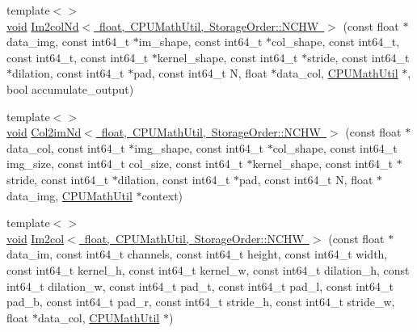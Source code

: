 \begin{DoxyCompactItemize}
\item 
{\footnotesize template$<$$>$ }\\\mbox{\hyperlink{mlasi_8h_a88f941d423cb2a819b70a1358982b1a6}{void}} \mbox{\hyperlink{namespaceonnxruntime_1_1math_a81ac2d7f2ea2b9bc15c568bc0733f7b9}{Im2col\+Nd$<$ float, C\+P\+U\+Math\+Util, Storage\+Order\+::\+N\+C\+H\+W $>$}} (const float $\ast$data\+\_\+img, const int64\+\_\+t $\ast$im\+\_\+shape, const int64\+\_\+t $\ast$col\+\_\+shape, const int64\+\_\+t, const int64\+\_\+t, const int64\+\_\+t $\ast$kernel\+\_\+shape, const int64\+\_\+t $\ast$stride, const int64\+\_\+t $\ast$dilation, const int64\+\_\+t $\ast$pad, const int64\+\_\+t N, float $\ast$data\+\_\+col, \mbox{\hyperlink{classonnxruntime_1_1CPUMathUtil}{C\+P\+U\+Math\+Util}} $\ast$, bool accumulate\+\_\+output)
\item 
{\footnotesize template$<$$>$ }\\\mbox{\hyperlink{mlasi_8h_a88f941d423cb2a819b70a1358982b1a6}{void}} \mbox{\hyperlink{namespaceonnxruntime_1_1math_a8e8d34a7f9a4fcf0b2f8f511f75b20cc}{Col2im\+Nd$<$ float, C\+P\+U\+Math\+Util, Storage\+Order\+::\+N\+C\+H\+W $>$}} (const float $\ast$data\+\_\+col, const int64\+\_\+t $\ast$img\+\_\+shape, const int64\+\_\+t $\ast$col\+\_\+shape, const int64\+\_\+t img\+\_\+size, const int64\+\_\+t col\+\_\+size, const int64\+\_\+t $\ast$kernel\+\_\+shape, const int64\+\_\+t $\ast$stride, const int64\+\_\+t $\ast$dilation, const int64\+\_\+t $\ast$pad, const int64\+\_\+t N, float $\ast$data\+\_\+img, \mbox{\hyperlink{classonnxruntime_1_1CPUMathUtil}{C\+P\+U\+Math\+Util}} $\ast$context)
\item 
{\footnotesize template$<$$>$ }\\\mbox{\hyperlink{mlasi_8h_a88f941d423cb2a819b70a1358982b1a6}{void}} \mbox{\hyperlink{namespaceonnxruntime_1_1math_afb1aa82e9ab3e9b38a7062dc6a0ea6d5}{Im2col$<$ float, C\+P\+U\+Math\+Util, Storage\+Order\+::\+N\+C\+H\+W $>$}} (const float $\ast$data\+\_\+im, const int64\+\_\+t channels, const int64\+\_\+t height, const int64\+\_\+t width, const int64\+\_\+t kernel\+\_\+h, const int64\+\_\+t kernel\+\_\+w, const int64\+\_\+t dilation\+\_\+h, const int64\+\_\+t dilation\+\_\+w, const int64\+\_\+t pad\+\_\+t, const int64\+\_\+t pad\+\_\+l, const int64\+\_\+t pad\+\_\+b, const int64\+\_\+t pad\+\_\+r, const int64\+\_\+t stride\+\_\+h, const int64\+\_\+t stride\+\_\+w, float $\ast$data\+\_\+col, \mbox{\hyperlink{classonnxruntime_1_1CPUMathUtil}{C\+P\+U\+Math\+Util}} $\ast$)
\item 

\end{DoxyCompactItemize}
